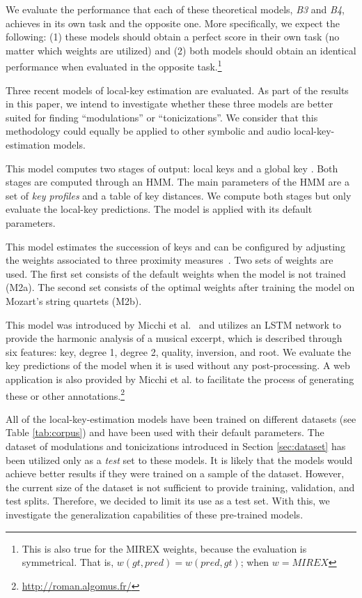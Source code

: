 We evaluate the performance that each of these theoretical
models, \emph{B3} and \emph{B4}, achieves in its own task
and the opposite one. More specifically, we expect the
following: (1) these models should obtain a perfect score in
their own task (no matter which weights are utilized) and
(2) both models should obtain an identical performance when
evaluated in the opposite task.\footnote{This is also true
for the MIREX weights, because the evaluation is
symmetrical. That is, $w(gt, pred) = w(pred, gt)$; when
$w=MIREX$}

Three recent models of local-key estimation are evaluated.
As part of the results in this paper, we intend to
investigate whether these three models are better suited for
finding ``modulations'' or ``tonicizations''. We consider
that this methodology could equally be applied to other
symbolic and audio local-key-estimation models.

 This model computes
two stages of output: local keys and a global key
\parencite{napoleslopez2019key}. Both stages are computed through
an HMM. The main parameters of the HMM are a set of
\emph{key profiles} and a table of key distances. We compute
both stages but only evaluate the local-key predictions. The
model is applied with its default parameters.

This model estimates the succession of keys and can be
configured by adjusting the weights associated to three
proximity measures~\parencite{feisthauer2020smc}. Two sets of
weights are used. The first set consists of the default
weights when the model is not trained (M2a). The second set
consists of the optimal weights after training the model on
Mozart's string quartets (M2b).

This model was introduced by Micchi et
al.~\parencite{micchi20roman} and utilizes an LSTM network to
provide the harmonic analysis of a musical excerpt, which is
described through six features: key, degree 1, degree 2,
quality, inversion, and root. We evaluate the key
predictions of the model when it is used without any
post-processing. A web application is also provided by
Micchi et al. to facilitate the process of generating these
or other
annotations.\footnote{\url{http://roman.algomus.fr/}}

All of the local-key-estimation models have been trained on
different datasets (see Table \ref{tab:corpus}) and have
been used with their default parameters. The dataset of
modulations and tonicizations introduced in Section
\ref{sec:dataset} has been utilized only as a \emph{test}
set to these models. It is likely that the models would
achieve better results if they were trained on a sample of
the dataset. However, the current size of the dataset is not
sufficient to provide training, validation, and test splits.
Therefore, we decided to limit its use as a test set. With
this, we investigate the generalization capabilities of
these pre-trained models.

